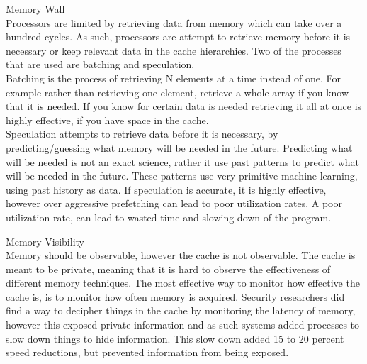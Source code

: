 \documentclass[twoside]{article}
\begin{document}
Memory Wall \\
Processors are limited by retrieving data from memory which can take over a hundred cycles. As such, processors are attempt to retrieve memory before it is necessary or keep relevant data in the cache hierarchies. Two of the processes that are used are batching and speculation. \\

Batching is the process of retrieving N elements at a time instead of one. For example rather than retrieving one element, retrieve a whole array if you know that it is needed. If you know for certain data is needed retrieving it all at once is highly effective, if you have space in the cache.\\

Speculation attempts to retrieve data before it is necessary, by predicting/guessing what memory will be needed in the future. Predicting what will be needed is not an exact science, rather it use past patterns to predict what will be needed in the future. These patterns use very primitive machine learning, using past history as data. If speculation is accurate, it is highly effective, however over aggressive prefetching can lead to poor utilization rates. A poor utilization rate, can lead to wasted time and slowing down of the program. 


Memory Visibility \\
Memory should be observable, however the cache is not observable. The cache is meant to be private, meaning that it is hard to observe the effectiveness of different memory techniques. The most effective way to monitor how effective the cache is, is to monitor how often memory is acquired. Security researchers did find a way to decipher things in the cache by monitoring the latency of memory, however this exposed private information and as such systems added processes to slow down things to hide information. This slow down added 15 to 20 percent speed reductions, but prevented information from being exposed. 
\end{document}
